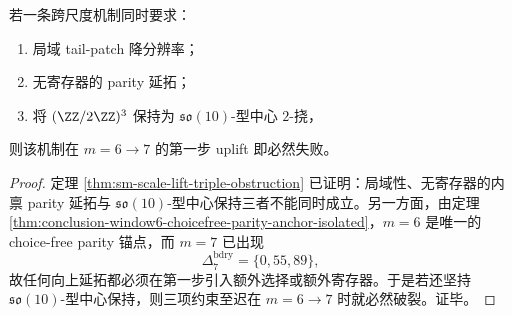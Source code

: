 \begin{theorem}\label{thm:conclusion-window6-first-uplift-so10-trilemma}
若一条跨尺度机制同时要求：
\begin{enumerate}
  \item 局域 tail-patch 降分辨率；
  \item 无寄存器的 parity 延拓；
  \item 将 \((\ZZ/2\ZZ)^3\) 保持为 \(\mathfrak{so}(10)\)-型中心 \(2\)-挠，
\end{enumerate}
则该机制在 \(m=6\to 7\) 的第一步 uplift 即必然失败。
\end{theorem}
\begin{proof}
定理 \ref{thm:sm-scale-lift-triple-obstruction} 已证明：局域性、无寄存器的内禀 parity 延拓与 \(\mathfrak{so}(10)\)-型中心保持三者不能同时成立。另一方面，由定理 \ref{thm:conclusion-window6-choicefree-parity-anchor-isolated}，\(m=6\) 是唯一的 choice-free parity 锚点，而 \(m=7\) 已出现
\[
\Delta_7^{\mathrm{bdry}}=\{0,55,89\},
\]
故任何向上延拓都必须在第一步引入额外选择或额外寄存器。于是若还坚持 \(\mathfrak{so}(10)\)-型中心保持，则三项约束至迟在 \(m=6\to 7\) 时就必然破裂。证毕。
\end{proof}
